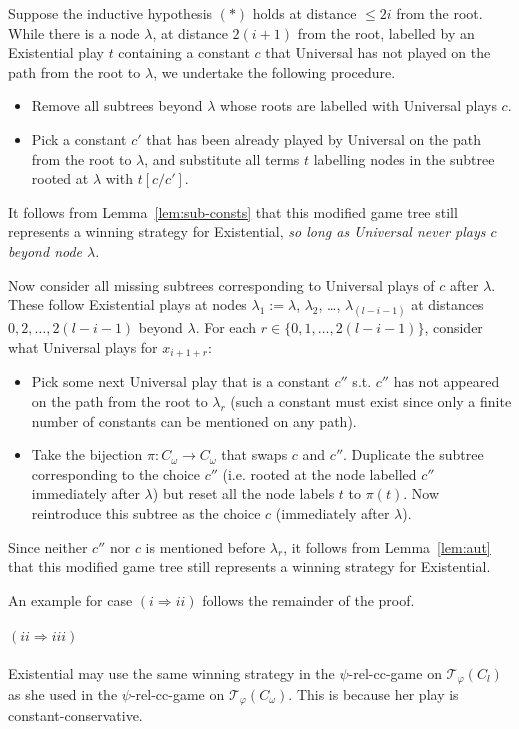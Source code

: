 \documentclass{LMCS}
\begin{document}
Suppose the inductive hypothesis $(*)$ holds at distance $\leq 2i$ from the root. While there is a node $\lambda$, at distance $2(i+1)$ from the root, labelled by an Existential play $t$ containing a constant $c$ that Universal has not played on the path from the root to $\lambda$, we undertake the following procedure.
\begin{itemize}
\item Remove all subtrees beyond $\lambda$ whose roots are labelled with Universal plays $c$. 
\item Pick a constant $c'$ that has been already played by Universal on the path from the root to $\lambda$, and substitute all terms $t$ labelling nodes in the subtree rooted at $\lambda$ with $t[c/c']$.
\end{itemize}
It follows from Lemma~\ref{lem:sub-consts} that this modified game tree still represents a winning strategy for Existential, \emph{so long as Universal never plays $c$ beyond node $\lambda$}. 

Now consider all missing subtrees corresponding to Universal plays of $c$ after $\lambda$. These follow Existential plays at nodes $\lambda_1:=\lambda$, $\lambda_2$, \ldots, $\lambda_{(l-i-1)}$ at distances $0,2,\ldots,2(l-i-1)$ beyond $\lambda$. For each $r \in \{0,1,\ldots,2(l-i-1)\}$, consider what Universal plays for $x_{i+1+r}$:
\begin{itemize}
\item Pick some next Universal play that is a constant $c''$ s.t. $c''$ has not appeared on the path from the root to $\lambda_r$ (such a constant must exist since only a finite number of constants can be mentioned on any path). 
\item Take the bijection $\pi:C_\omega \rightarrow C_\omega$ that swaps $c$ and $c''$. Duplicate the subtree corresponding to the choice $c''$ (i.e. rooted at the node labelled $c''$ immediately after $\lambda$) but reset all the node labels $t$ to $\pi(t)$. Now reintroduce this subtree as the choice $c$ (immediately after $\lambda$). 
\end{itemize}
Since neither $c''$ nor $c$ is mentioned before $\lambda_r$, it follows from Lemma~\ref{lem:aut} that this modified game tree still represents a winning strategy for Existential.

An example for case $(i \Rightarrow ii)$ follows the remainder of the proof.


\paragraph{$(ii \Rightarrow iii)$}
Existential may use the same winning strategy in the $\psi$-rel-cc-game on $\mathcal{T}_\varphi(C_l)$ as she used in the $\psi$-rel-cc-game on $\mathcal{T}_\varphi(C_\omega)$. This is because her play is constant-conservative.
\end{document}

